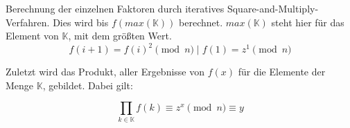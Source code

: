         Berechnung der einzelnen Faktoren durch iteratives Square-and-Multiply-Verfahren. Dies wird bis $f(max(\mathbb{K}))$ berechnet. $max(\mathbb{K})$ steht hier für das Element von $\mathbb{K}$, mit dem größten Wert.
        \begin{equation}
            f(i+1) = f(i)^{2} \pmod n \mid f(1) = z^{1} \pmod n 
        \end{equation}

        Zuletzt wird das Produkt, aller Ergebnisse von $f(x)$ für die Elemente der Menge $\mathbb{K}$, gebildet. Dabei gilt:

        \begin{equation}
            \prod_{k \in \mathbb{K}} f(k) \equiv z^{x} \pmod n \equiv y
        \end{equation}




